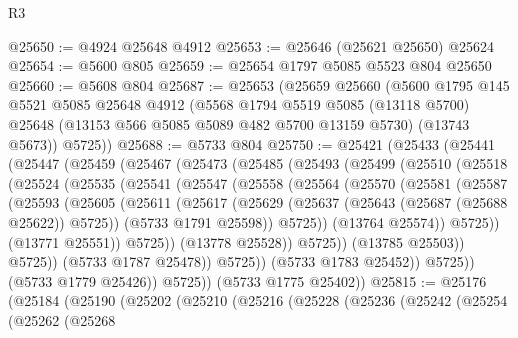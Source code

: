 \begin{lexlean}{R3}
\begin{coremodule}
@25650 := @4924 @25648 @4912
@25653 := @25646 (@25621 @25650) @25624
@25654 := @5600 @805
@25659 := @25654 @1797 @5085 @5523 @804 @25650
@25660 := @5608 @804
@25687 := @25653
    (@25659
      @25660
      (@5600
        @1795
        @145
        @5521
        @5085
        @25648
        @4912
        (@5568
          @1794
          @5519
          @5085
          (@13118 @5700)
          @25648
          (@13153 @566 @5085 @5089 @482 @5700 @13159 @5730)
          (@13743 @5673))
        @5725))
@25688 := @5733 @804
@25750 := @25421
    (@25433
      (@25441
        (@25447
          (@25459
            (@25467
              (@25473
                (@25485
                  (@25493
                    (@25499
                      (@25510
                        (@25518
                          (@25524
                            (@25535
                              (@25541
                                (@25547
                                  (@25558
                                    (@25564
                                      (@25570
                                        (@25581
                                          (@25587
                                            (@25593
                                              (@25605
                                                (@25611
                                                  (@25617
                                                    (@25629
                                                      (@25637
                                                        (@25643 (@25687 (@25688 @25622)) @5725))
                                                      (@5733 @1791 @25598))
                                                    @5725))
                                                (@13764 @25574))
                                              @5725))
                                          (@13771 @25551))
                                        @5725))
                                    (@13778 @25528))
                                  @5725))
                              (@13785 @25503))
                            @5725))
                        (@5733 @1787 @25478))
                      @5725))
                  (@5733 @1783 @25452))
                @5725))
            (@5733 @1779 @25426))
          @5725))
      (@5733 @1775 @25402))
@25815 := @25176
    (@25184
      (@25190
        (@25202
          (@25210
            (@25216
              (@25228
                (@25236
                  (@25242
                    (@25254
                      (@25262
                        (@25268

\end{coremodule}
\end{lexlean}
